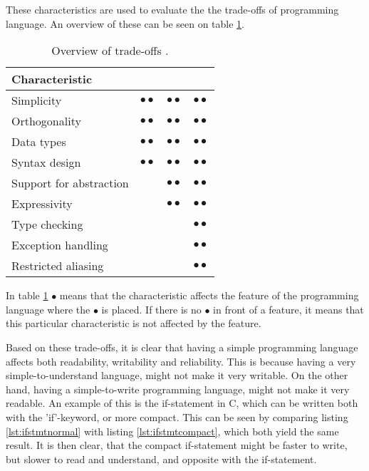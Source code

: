These characteristics are used to evaluate the the trade-offs of programming language. An overview of these can be seen on table \ref{tab:langTradeOffs}.

\begin{table}[H]
	\begin{tabular}{l|c|c|c|}
\textbf{Characteristic}			& \rotatebox{90}{Readability}	&\rotatebox{90}{Writability}	& \rotatebox{90}{Reliability} \\ \hline
		Simplicity 				& $\bullet{•}$ 					& $\bullet{•}$ 					& $\bullet{•}$ 				  \\ \hline
		Orthogonality 			& $\bullet{•}$ 					& $\bullet{•}$ 					& $\bullet{•}$ 				  \\ \hline
		Data types 				& $\bullet{•}$ 					& $\bullet{•}$ 					& $\bullet{•}$ 				  \\ \hline
		Syntax design 			& $\bullet{•}$ 					& $\bullet{•}$ 					& $\bullet{•}$ 				  \\ \hline
		Support for abstraction	& ~ 							& $\bullet{•}$ 					& $\bullet{•}$ 				  \\ \hline
		Expressivity 			& ~ 							& $\bullet{•}$ 					& $\bullet{•}$ 				  \\ \hline
		Type checking 			& ~ 							& ~ 							& $\bullet{•}$ 				  \\ \hline
		Exception handling 		& ~ 							& ~ 							& $\bullet{•}$ 				  \\ \hline
		Restricted aliasing 	& ~ 							& ~ 							& $\bullet{•}$ 				  \\ \hline
	\end{tabular}
	\caption{Overview of trade-offs \citep{sebesta}.}
	\label{tab:langTradeOffs}
\end{table}

In table \ref{tab:langTradeOffs} $\bullet$ means that the characteristic affects the feature of the programming language where the $\bullet$ is placed. If there is no $\bullet$ in front of a feature, it means that this particular characteristic is not affected by the feature. 

Based on these trade-offs, it is clear that having a simple programming language affects both readability, writability and reliability. This is because having a very simple-to-understand language, might not make it very writable. On the other hand, having a simple-to-write programming language, might not make it very readable. An example of this is the if-statement in C, which can be written both with the 'if'-keyword, or more compact. This can be seen by comparing listing \ref{lst:ifstmtnormal} with listing \ref{lst:ifstmtcompact}, which both yield the same result. It is then clear, that the compact if-statement might be faster to write, but slower to read and understand, and opposite with the if-statement.


